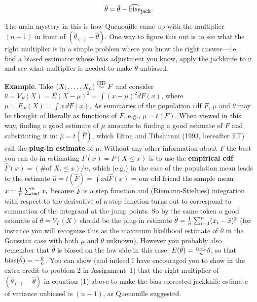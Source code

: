 \documentclass[11pt]{article}
\begin{document}
\begin{equation}
{\bar \theta} = {\hat \theta} -
\widehat{\mbox{bias}}_{\mbox{\footnotesize jack}} .
\end{equation}
\smallskip
\smallskip

The main mystery in this is how Quenouille came up with the multiplier
$(n - 1)$ in front of $({\hat \theta}_{(\cdot)} - {\hat \theta})$. One
way to figure this out is to see what the right multiplier is in a
simple problem where you know the right answer---i.e., find a biased
estimator whose bias adjustment you know, apply the jackknife to it and
see what multiplier is needed to make $\bar \theta$ unbiased.
\smallskip
\smallskip

\pagebreak

{\bf Example}. Take $(X_1, \ldots, X_n) \stackrel{\mbox{\footnotesize
IID}}{\sim} F$ and consider $\theta = V_F(X) = E(X - \mu)^2 = \int (x -
\mu)^2 dF(x)$, where $\mu = E_F(X) = \int x \, dF(x)$. As summaries of
the population cdf $F$, $\mu$ and $\theta$ may be thought of literally
as functions of $F$, e.g., $\mu = t(F)$. When viewed in this way,
finding a good estimate of $\mu$ amounts to finding a good estimate of
$F$ and substituting it in: ${\hat \mu} = t({\hat F})$, which Efron and
Tibshirani (1993, hereafter ET) call the {\bf plug-in estimate} of
$\mu$. Without any other information about $F$ the best you can do in
estimating $F(x) = P(X \leq x)$ is to use the {\bf empirical cdf} ${\hat
F}(x) = (\mbox{\# of }X_i \leq x)/n$, which (e.g.) in the case of the
population mean leads to the estimate ${\hat \mu} = t({\hat F}) = \int x
d{\hat F}(x)$ = our old friend the sample mean ${\bar x} = {1 \over n}
\sum_{i=1}^n x_i$ because $\hat F$ is a step function and
(Riemann-Stieltjes) integration with respect to the derivative of a step
function turns out to correspond to summation of the integrand at the
jump points. So by the same token a good estimate of $\theta = V_F(X)$
should be the plug-in estimate ${\hat \theta} = {1 \over n} \sum_{i=1}^n
(x_i - {\bar x})^2$ (for instance you will recognize this as the maximum
likelihood estimate of $\theta$ in the Gaussian case with both $\mu$ and
$\theta$ unknown).  However you probably also remember that $\hat
\theta$ is biased on the low side in this case: $E({\hat \theta}) = {{n
- 1} \over n} \theta$, so that $\mbox{bias}({\hat \theta}) = - {\theta
\over n}$.  You can show (and indeed I have encouraged you to show in
the extra credit to problem 2 in Assignment~1) that the right multiplier
of $({\hat \theta}_{(\cdot)} - {\hat \theta})$ in equation (1) above to
make the bias-corrected jackknife estimate of variance unbiased is $(n -
1)$, as Quenouille suggested.
\smallskip
\smallskip
\end{document}
